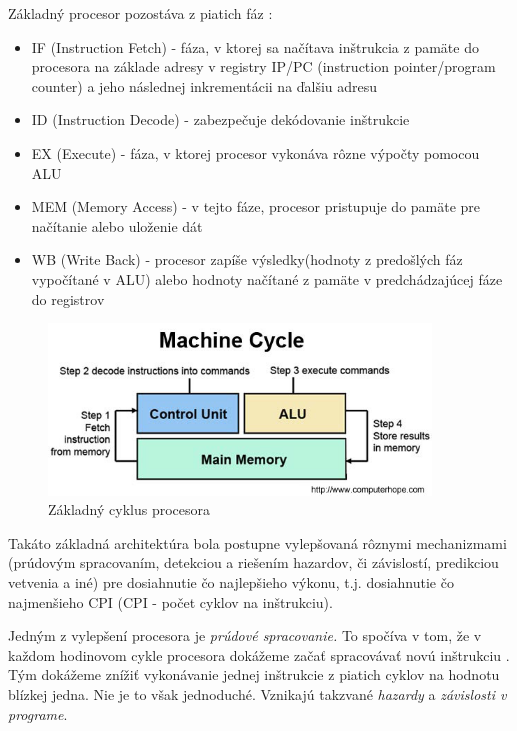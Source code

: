 \documentclass[conference]{IEEEtran}
\begin{document}
Základný procesor pozostáva z piatich fáz \cite{hennessy2007compute}: 

\begin{itemize}
	\item{IF (Instruction Fetch) - fáza, v ktorej sa načítava inštrukcia z pamäte do procesora na základe adresy v registry IP/PC (instruction pointer/program counter) a jeho následnej inkrementácii na ďalšiu adresu }
	\item{ID (Instruction Decode) - zabezpečuje dekódovanie inštrukcie}
	\item{EX (Execute) - fáza, v ktorej procesor vykonáva rôzne výpočty pomocou ALU}
	\item{MEM (Memory Access) - v tejto fáze, procesor pristupuje do pamäte pre načítanie alebo uloženie dát}
	\item{WB (Write Back) - procesor zapíše výsledky(hodnoty z predošlých fáz vypočítané v ALU) alebo hodnoty načítané z pamäte v predchádzajúcej fáze do registrov}
\end{itemize}

\begin{figure}[!h]
\centering
\includegraphics[width=4in]{img/CPU-cycle}
\caption{Základný cyklus procesora}
\end{figure}

Takáto základná architektúra bola postupne vylepšovaná rôznymi mechanizmami (prúdovým spracovaním, detekciou a riešením hazardov, či závislostí, predikciou vetvenia a iné) pre dosiahnutie čo najlepšieho výkonu, t.j. dosiahnutie čo najmenšieho CPI (CPI - počet cyklov na inštrukciu).

Jedným z vylepšení procesora je \textit{prúdové spracovanie.} To spočíva v tom, že v každom hodinovom cykle procesora dokážeme začať spracovávať novú inštrukciu \cite{hennessy2007compute}. Tým dokážeme znížiť vykonávanie jednej inštrukcie z piatich cyklov  na hodnotu blízkej jedna. Nie je to však jednoduché. Vznikajú takzvané \textit{hazardy} a \textit{závislosti v programe}. 
\end{document}
